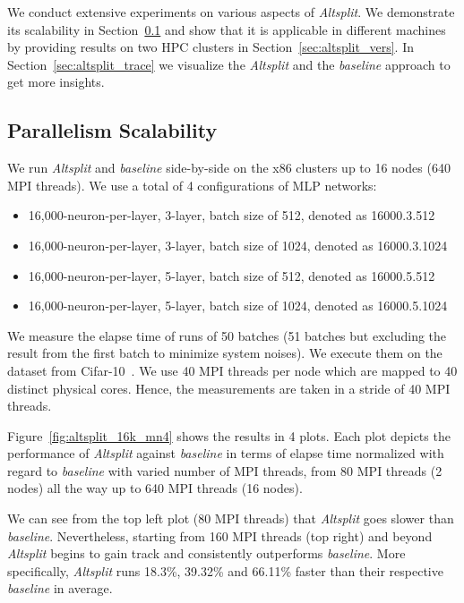 We conduct extensive experiments on various aspects of \emph{Altsplit}. We
demonstrate its scalability in Section~\ref{sec:altsplit_scalability} and
show that it is applicable in different machines by providing results on
two HPC clusters in Section~\ref{sec:altsplit_vers}. In Section~\ref{sec:altsplit_trace}
we visualize the \emph{Altsplit} and the \emph{baseline} approach to get more
insights.

\subsection{Parallelism Scalability}
\label{sec:altsplit_scalability}
We run \emph{Altsplit} and \emph{baseline} side-by-side on the x86 clusters
up to 16 nodes (640 MPI threads). We use a total of 4 configurations of MLP networks: 
\begin{itemize}
   \item 16,000-neuron-per-layer, 3-layer, batch size of 512, denoted as 16000.3.512
   \item 16,000-neuron-per-layer, 3-layer, batch size of 1024, denoted as 16000.3.1024
   \item 16,000-neuron-per-layer, 5-layer, batch size of 512, denoted as 16000.5.512
   \item 16,000-neuron-per-layer, 5-layer, batch size of 1024, denoted as 16000.5.1024
\end{itemize}
We measure the elapse time of runs of 50 batches (51 batches but excluding the result from
the first batch to minimize system noises). We execute them on the dataset from 
Cifar-10~\cite{cifar10}. We use 40 MPI threads per node which are mapped to 40 distinct
physical cores. Hence, the measurements are taken in a stride of 40 MPI threads.

Figure~\ref{fig:altsplit_16k_mn4} shows the results in 4 plots. Each plot 
depicts the performance of \emph{Altsplit} against \emph{baseline} in terms of 
elapse time normalized with regard to \emph{baseline} with varied number of MPI 
threads, from 80 MPI threads (2 nodes) all the way up to 640 MPI threads (16 nodes).

We can see from the top left plot (80 MPI threads) that \emph{Altsplit} goes slower than
\emph{baseline}. Nevertheless, starting from 160 MPI threads (top right) and beyond 
\emph{Altsplit} begins to gain track and consistently outperforms \emph{baseline}. 
More specifically, \emph{Altsplit} runs 18.3\%, 39.32\% and 66.11\% faster than their 
respective \emph{baseline} in average.

